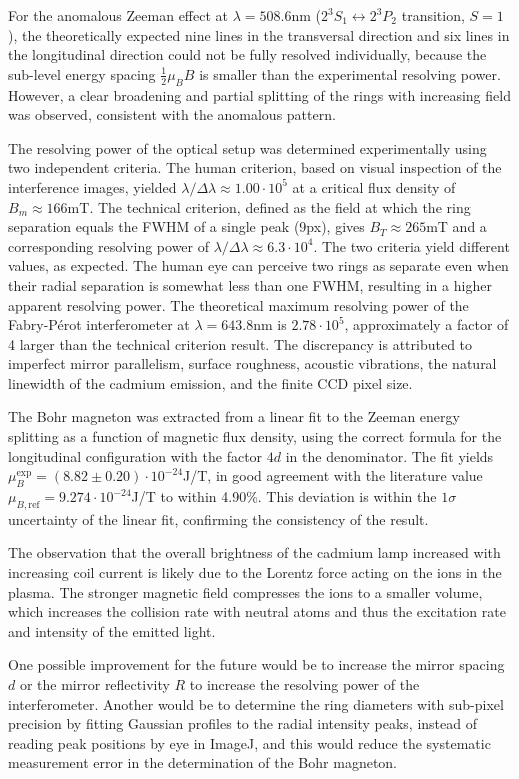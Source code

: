 \documentclass{article}
\begin{document}
For the anomalous Zeeman effect at $\lambda = 508.6$nm ($2^3S_1 \leftrightarrow 2^3P_2$ transition, $S=1$), the theoretically expected nine lines in the transversal direction and six lines in the longitudinal direction could not be fully resolved individually, because the sub-level energy spacing $\frac{1}{2}\mu_B B$ is smaller than the experimental resolving power. However, a clear broadening and partial splitting of the rings with increasing field was observed, consistent with the anomalous pattern.

The resolving power of the optical setup was determined experimentally using two independent criteria. The human criterion, based on visual inspection of the interference images, yielded $\lambda/\Delta\lambda \approx 1.00\cdot 10^5$ at a critical flux density of $B_m \approx 166$mT. The technical criterion, defined as the field at which the ring separation equals the FWHM of a single peak (9px), gives $B_T \approx 265$mT and a corresponding resolving power of $\lambda/\Delta\lambda \approx 6.3\cdot 10^4$. The two criteria yield different values, as expected. The human eye can perceive two rings as separate even when their radial separation is somewhat less than one FWHM, resulting in a higher apparent resolving power. The theoretical maximum resolving power of the Fabry-Pérot interferometer at $\lambda = 643.8$nm is $2.78\cdot 10^5$, approximately a factor of 4 larger than the technical criterion result. The discrepancy is attributed to imperfect mirror parallelism, surface roughness, acoustic vibrations, the natural linewidth of the cadmium emission, and the finite CCD pixel size.

The Bohr magneton was extracted from a linear fit to the Zeeman energy splitting as a function of magnetic flux density, using the correct formula for the longitudinal configuration with the factor $4d$ in the denominator. The fit yields $\mu_B^\mathrm{exp} = (8.82 \pm 0.20)\cdot10^{-24}$J/T, in good agreement with the literature value $\mu_{B,\mathrm{ref}} = 9.274\cdot10^{-24}$J/T to within 4.90\%. This deviation is within the $1\sigma$ uncertainty of the linear fit, confirming the consistency of the result.

The observation that the overall brightness of the cadmium lamp increased with increasing coil current is likely due to the Lorentz force acting on the ions in the plasma. The stronger magnetic field compresses the ions to a smaller volume, which increases the collision rate with neutral atoms and thus the excitation rate and intensity of the emitted light.

One possible improvement for the future would be to increase the mirror spacing $d$ or the mirror reflectivity $R$ to increase the resolving power of the interferometer. Another would be to determine the ring diameters with sub-pixel precision by fitting Gaussian profiles to the radial intensity peaks, instead of reading peak positions by eye in ImageJ, and this would reduce the systematic measurement error in the determination of the Bohr magneton.

\newpage
\listoffigures
\listoftables

\nocite{*}
\printbibliography
\end{document}
